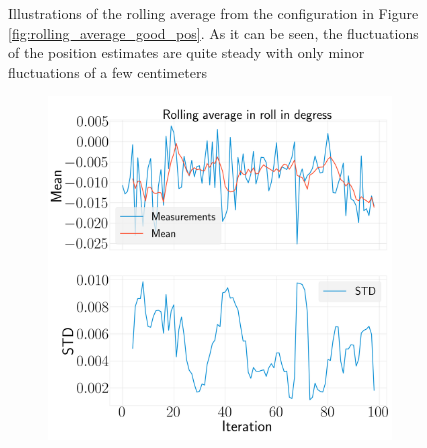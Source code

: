 \documentclass[../Head/report.tex]{subfiles}
\begin{document}
\begin{figure}[H]
\begin{subfigure}[t]{.30\textwidth}
        \caption{}
        \label{fig:rolling_average_in_z_test1}
    \end{subfigure}
    \caption{Illustrations of the rolling average from the configuration in Figure \ref{fig:rolling_average_good_pos}. As it can be seen, the fluctuations of the position estimates are quite steady with only minor fluctuations of a few centimeters}
    \label{fig:rolling_average_pos_test1}
\end{figure}

\begin{figure}[H]
    \centering
    \begin{subfigure}[t]{.30\textwidth}
        \centering
        \includegraphics[width=\textwidth]{../Figures/analyse_rolling_average/test1/Calculated_rolling_average_in_roll_with_mean_and_STD.png}
        \caption{}
        \label{fig:rolling_average_in_roll_test1}
    \end{subfigure}
     \hspace{0.2em}
    \begin{subfigure}[t]{.30\textwidth}
        \centering

\end{subfigure}
\end{figure}
\end{document}

